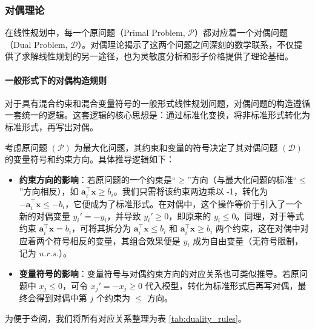 \documentclass[12pt]{article}
\theoremstyle{plain}
\theoremstyle{definition}
\begin{document}
\subsubsection{对偶理论}\label{subsubsec:duality_theory}

在线性规划中，每一个原问题（Primal Problem, $\mathcal{P}$）都对应着一个对偶问题（Dual Problem, $\mathcal{D}$）。对偶理论揭示了这两个问题之间深刻的数学联系，不仅提供了求解线性规划的另一途径，也为灵敏度分析和影子价格提供了理论基础。

\paragraph{一般形式下的对偶构造规则}
对于具有混合约束和混合变量符号的一般形式线性规划问题，对偶问题的构造遵循一套统一的逻辑。这套逻辑的核心思想是：通过标准化变换，将非标准形式转化为标准形式，再写出对偶。

考虑原问题 $(\mathcal{P})$ 为最大化问题，其约束和变量的符号决定了其对偶问题 $(\mathcal{D})$ 的变量符号和约束方向。具体推导逻辑如下：
\begin{itemize}
    \item \textbf{约束方向的影响}：若原问题的一个约束是“$\geq$”方向（与最大化问题的标准“$\leq$”方向相反），如 $\bm{a}_i^\top \bm{x} \geq b_i$。我们只需将该约束两边乘以 -1，转化为 $-\bm{a}_i^\top \bm{x} \leq -b_i$，它便成为了标准形式。在对偶中，这个操作等价于引入了一个新的对偶变量 $y_i' = -y_i$，并导致 $y_i' \geq 0$，即原来的 $y_i \leq 0$。同理，对于等式约束 $\bm{a}_i^\top \bm{x} = b_i$，可将其拆分为 $\bm{a}_i^\top \bm{x} \leq b_i$ 和 $\bm{a}_i^\top \bm{x} \geq b_i$ 两个约束，这在对偶中对应着两个符号相反的变量，其组合效果便是 $y_i$ 成为自由变量（无符号限制，记为 $u.r.s.$）。
    \item \textbf{变量符号的影响}：变量符号与对偶约束方向的对应关系也可类似推导。若原问题中 $x_j \leq 0$，可令 $x_j' = -x_j \geq 0$ 代入模型，转化为标准形式后再写对偶，最终会得到对偶中第 $j$ 个约束为 $\leq$ 方向。
\end{itemize}

为便于查阅，我们将所有对应关系整理为表 \ref{tab:duality_rules}。
\end{document}
